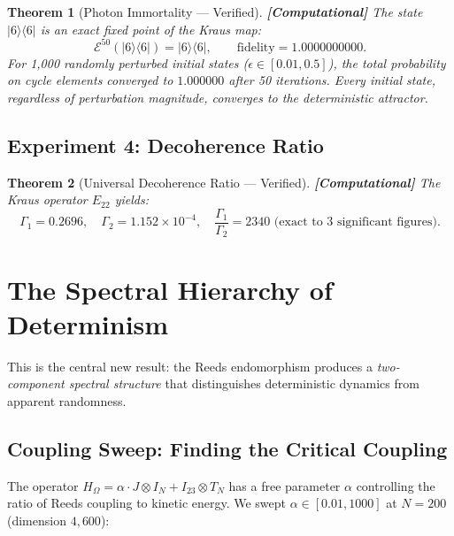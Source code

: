 \documentclass[12pt,a4paper]{article}
\newcommand{\computational}[1]{\textcolor{computational}{\textbf{[Computational]}} #1}
\newtheorem{theorem}{Theorem}[section]
\theoremstyle{definition}
\theoremstyle{remark}
\newcommand{\Kraus}{\mathcal{E}}
\newcommand{\Jcoup}{J}
\newcommand{\HOmega}{H_\Omega}
\begin{document}
\begin{theorem}[Photon Immortality --- Verified]
\label{thm:photon_verified}
\computational{The state $|6\rangle\langle 6|$ is an exact fixed point of the Kraus map:}
\begin{equation}
  \Kraus^{50}(|6\rangle\langle 6|) = |6\rangle\langle 6|, \qquad \text{fidelity} = 1.0000000000.
\end{equation}
For 1{,}000 randomly perturbed initial states ($\epsilon \in [0.01, 0.5]$), the total probability on cycle elements converged to $1.000000$ after 50 iterations. Every initial state, regardless of perturbation magnitude, converges to the deterministic attractor.
\end{theorem}

\subsection{Experiment 4: Decoherence Ratio}

\begin{theorem}[Universal Decoherence Ratio --- Verified]
\label{thm:ratio_verified}
\computational{The Kraus operator $E_{22}$ yields:}
\begin{equation}
  \Gamma_1 = 0.2696, \quad \Gamma_2 = 1.152 \times 10^{-4}, \quad \frac{\Gamma_1}{\Gamma_2} = 2340 \text{ (exact to 3 significant figures)}.
\end{equation}
\end{theorem}

\section{The Spectral Hierarchy of Determinism}
\label{sec:hierarchy}

This is the central new result: the Reeds endomorphism produces a
\emph{two-component spectral structure} that distinguishes deterministic dynamics
from apparent randomness.

\subsection{Coupling Sweep: Finding the Critical Coupling}

The operator $\HOmega = \alpha \cdot \Jcoup \otimes I_N + I_{23} \otimes T_N$ has
a free parameter $\alpha$ controlling the ratio of Reeds coupling to kinetic
energy. We swept $\alpha \in [0.01, 1000]$ at $N = 200$ (dimension $4{,}600$):
\end{document}
